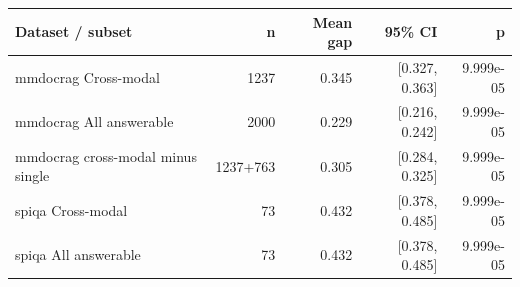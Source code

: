 \begin{tabular}{lrrrr}
\toprule
Dataset / subset & n & Mean gap & 95\% CI & p \\
\midrule
mmdocrag Cross-modal & 1237 & 0.345 & [0.327, 0.363] & 9.999e-05 \\
mmdocrag All answerable & 2000 & 0.229 & [0.216, 0.242] & 9.999e-05 \\
mmdocrag cross-modal minus single & 1237+763 & 0.305 & [0.284, 0.325] & 9.999e-05 \\
spiqa Cross-modal & 73 & 0.432 & [0.378, 0.485] & 9.999e-05 \\
spiqa All answerable & 73 & 0.432 & [0.378, 0.485] & 9.999e-05 \\
\bottomrule
\end{tabular}
